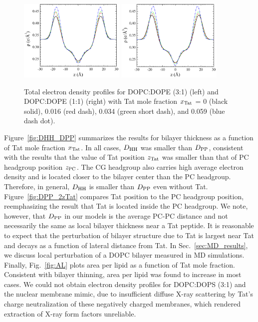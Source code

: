 \begin{figure}[htbp]
  \centering
  \includegraphics[width=0.45\textwidth]{figures/Tat/SDP_Results/EDP/DOPCDOPE3to1_Tat_total_EDP}
  \qquad
  \includegraphics[width=0.45\textwidth]{figures/Tat/SDP_Results/EDP/DOPCDOPE1to1_Tat_total_EDP}
  \caption[]{Total electron density profiles for DOPC:DOPE (3:1) (left) and 
  DOPC:DOPE (1:1) (right) with Tat mole fraction $x_\textrm{Tat}$ = 0 (black solid),
  0.016 (red dash), 0.034 (green short dash), and 0.059 (blue dash dot).}
  \label{fig:DOPCDOPE_Tat_total_EDP}
\end{figure}

Figure~\ref{fig:DHH_DPP} summarizes the results for bilayer thickness as a function
of Tat mole fraction $x_\textrm{Tat}$. In all cases, $D_\textrm{HH}$ was smaller than $D_\textrm{PP}$, consistent
with the results that the value of Tat position $z_\textrm{Tat}$ was smaller 
than that of PC headgroup position $z_\textrm{PC}$. The CG headgroup also carries 
high average electron density and is located closer to the bilayer center than
the PC headgroup. Therefore, in general, $D_\textrm{HH}$ is smaller than $D_\textrm{PP}$ even
without Tat. Figure~\ref{fig:DPP_2zTat} compares Tat position 
to the PC headgroup position, reemphasizing the result that Tat is located
inside the PC headgroup. We note, however, that $D_\textrm{PP}$ in our models is
the average PC-PC distance and not necessarily the same as local bilayer 
thickness near a Tat peptide. It is reasonable to expect that the perturbation
of bilayer structure due to Tat is largest near Tat and decays as a
function of lateral distance from Tat. In Sec.~\ref{sec:MD_results}, we 
discuss local perturbation of a DOPC bilayer measured in MD simulations.
Finally, Fig.~\ref{fig:AL} plots area per lipid as a function of Tat mole
fraction. Consistent with bilayer thinning, area per lipid was found to 
increase in most cases. 
We could not obtain electron density profiles for DOPC:DOPS (3:1) and the nuclear membrane 
mimic, due to insufficient diffuse X-ray scattering by Tat’s charge neutralization 
of these negatively charged membranes, which rendered extraction of 
X-ray form factors unreliable.

